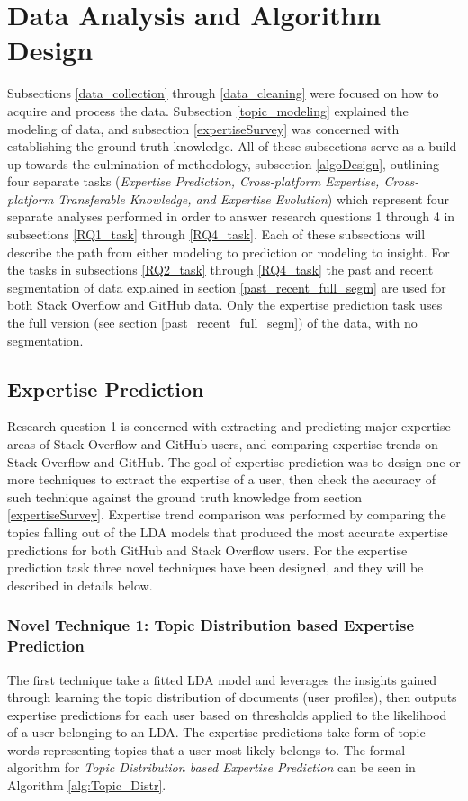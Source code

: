\section{Data Analysis and Algorithm Design\label{algoDesign}}

    Subsections \ref{data_collection} through \ref{data_cleaning} were focused on how to acquire and process the data. Subsection \ref{topic_modeling} explained the modeling of data, and subsection \ref{expertiseSurvey} was concerned with establishing the ground truth knowledge. All of these subsections serve as a build-up towards the culmination of methodology, subsection \ref{algoDesign}, outlining four separate tasks (\emph{Expertise Prediction, Cross-platform Expertise, Cross-platform Transferable Knowledge, and Expertise Evolution}) which represent four separate analyses performed in order to answer research questions 1 through 4 in subsections \ref{RQ1_task} through \ref{RQ4_task}. Each of these subsections will describe the path from either modeling to prediction or modeling to insight. For the tasks in subsections \ref{RQ2_task} through \ref{RQ4_task} the past and recent segmentation of data explained in section \ref{past_recent_full_segm} are used for both Stack Overflow and GitHub data. Only the expertise prediction task uses the full version (see section \ref{past_recent_full_segm}) of the data, with no segmentation. 
    
    \subsection{Expertise Prediction\label{RQ1_task}}
        Research question 1 is concerned with extracting and predicting major expertise areas of Stack Overflow and GitHub users, and comparing expertise trends on Stack Overflow and GitHub. The goal of expertise prediction was to design one or more techniques to extract the expertise of a user, then check the accuracy of such technique against the ground truth knowledge from section \ref{expertiseSurvey}. Expertise trend comparison was performed by comparing the topics falling out of the LDA models that produced the most accurate expertise predictions for both GitHub and Stack Overflow users. For the expertise prediction task three novel techniques have been designed, and they will be described in details below. 
        
        \subsubsection{Novel Technique 1: Topic Distribution based Expertise Prediction}
            The first technique take a fitted LDA model and leverages the insights gained through learning the topic distribution of documents (user profiles), then outputs expertise predictions for each user based on thresholds applied to the likelihood of a user belonging to an LDA. The expertise predictions take form of topic words representing topics that a user most likely belongs to. The formal algorithm for \emph{Topic Distribution based Expertise Prediction} can be seen in Algorithm \ref{alg:Topic_Distr}.
            
